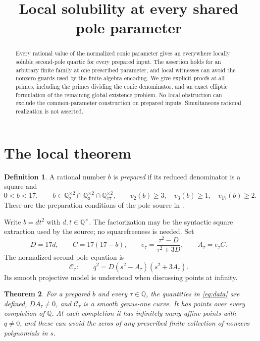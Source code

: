 \documentclass[11pt,a4paper]{article}
\title{Local solubility at every shared pole parameter}
\author{}\date{}
\newtheorem{theorem}{Theorem}[section]
\theoremstyle{definition}\newtheorem{definition}[theorem]{Definition}
\newcommand{\Q}{\mathbb Q}\newcommand{\F}{\mathbb F}
\begin{document}
\maketitle
\begin{abstract}
Every rational value of the normalized conic parameter gives an everywhere
locally soluble second-pole quartic for every prepared input. The assertion
holds for an arbitrary finite family at one prescribed parameter, and local
witnesses can avoid the nonzero guards used by the finite-algebra encoding.
We give explicit proofs at all primes, including the primes dividing the
conic denominator, and an exact elliptic formulation of the remaining global
existence problem. No local obstruction can exclude the common-parameter
construction on prepared inputs. Simultaneous rational realization is not
asserted.
\end{abstract}

\section{The local theorem}

\begin{definition}
A rational number $b$ is \emph{prepared} if its reduced denominator is a
square and
\[
 0<b<17,\qquad b\in\Q_2^{\times2}\cap\Q_3^{\times2}
 \cap\Q_{17}^{\times2},\qquad
 v_2(b)\ge3,\quad v_3(b)\ge1,\quad v_{17}(b)\ge2.
\]
These are the preparation conditions of the pole source in
\cite{Fixed,UnitNorm}.
\end{definition}

Write $b=dt^2$ with $d,t\in\Q^\times$. The factorization may be the
syntactic square extraction used by the source; no squarefreeness is needed.
Set
\begin{equation}\label{eq:data}
 D=17d,\qquad C=17(17-b),\qquad
 e_\tau=\frac{\tau^2-D}{\tau^2+3D},\qquad A_\tau=e_\tau C.
\end{equation}
The normalized second-pole equation is
\begin{equation}\label{eq:quartic}
 \mathcal C_\tau:\qquad
 q^2=D(s^2-A_\tau)(s^2+3A_\tau).
\end{equation}
Its smooth projective model is understood when discussing points at infinity.

\begin{theorem}\label{thm:local}
For a prepared $b$ and every $\tau\in\Q$, the quantities in
\eqref{eq:data} are defined, $D A_\tau\ne0$, and
$\mathcal C_\tau$ is a smooth genus-one curve. It has points over every
completion of $\Q$. At each completion it has infinitely many affine points
with $q\ne0$, and these can avoid the zeros of any prescribed finite
collection of nonzero polynomials in $s$.
\end{theorem}
\end{document}
